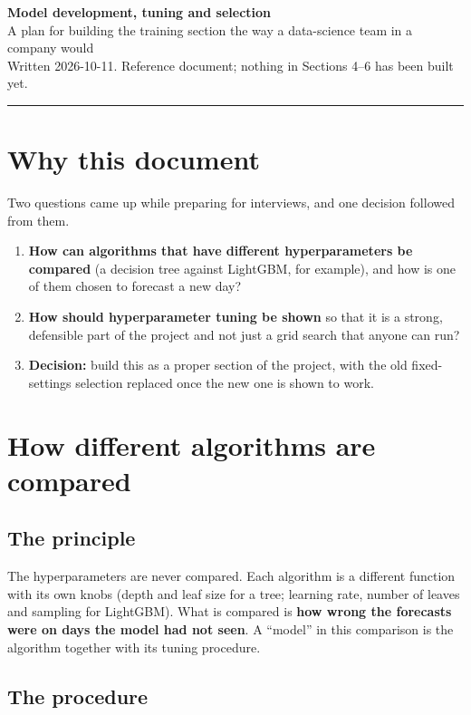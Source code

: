 \documentclass[11pt,a4paper]{article}
\begin{document}
{\LARGE\bfseries\color{accent} Model development, tuning and selection}\\[4pt]
{\large A plan for building the training section the way a data-science team in a company would}\\[2pt]
{\small Written 2026-10-11. Reference document; nothing in Sections 4--6 has been built yet.}

\medskip
\hrule

\section{Why this document}

Two questions came up while preparing for interviews, and one decision followed from them.

\begin{enumerate}
\item \textbf{How can algorithms that have different hyperparameters be compared} (a decision tree against LightGBM, for
      example), and how is one of them chosen to forecast a new day?
\item \textbf{How should hyperparameter tuning be shown} so that it is a strong, defensible part of the project and not just
      a grid search that anyone can run?
\item \textbf{Decision:} build this as a proper section of the project, with the old fixed-settings selection replaced once
      the new one is shown to work.
\end{enumerate}

\section{How different algorithms are compared}

\subsection{The principle}

The hyperparameters are never compared. Each algorithm is a different function with its own knobs (depth and leaf size for
a tree; learning rate, number of leaves and sampling for LightGBM). What is compared is \textbf{how wrong the forecasts
were on days the model had not seen}. A ``model'' in this comparison is the algorithm together with its tuning procedure.

\subsection{The procedure}
\end{document}

